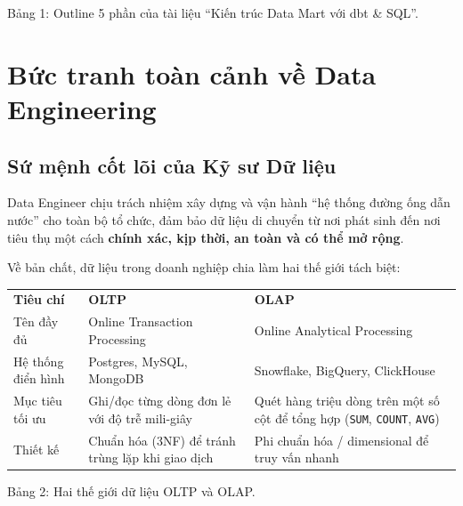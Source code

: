 \documentclass[12pt]{article}
\begin{document}
\begin{captionbelowboxaivn}
Bảng 1: Outline 5 phần của tài liệu ``Kiến trúc Data Mart với dbt \& SQL''.
\end{captionbelowboxaivn}

\section{Bức tranh toàn cảnh về Data Engineering}

\subsection{Sứ mệnh cốt lõi của Kỹ sư Dữ liệu}

Data Engineer chịu trách nhiệm xây dựng và vận hành ``hệ thống đường ống dẫn nước'' cho toàn bộ tổ chức, đảm bảo dữ liệu di chuyển từ nơi phát sinh đến nơi tiêu thụ một cách \textbf{chính xác, kịp thời, an toàn và có thể mở rộng}.

Về bản chất, dữ liệu trong doanh nghiệp chia làm hai thế giới tách biệt:

\noindent
\begin{longtable}{@{}>{\RaggedRight\arraybackslash}p{3.4cm}>{\RaggedRight\arraybackslash}p{4.4cm}>{\RaggedRight\arraybackslash}p{7.6cm}@{}}
\rowcolor{rowLavender}
\textbf{Tiêu chí} & \textbf{OLTP} & \textbf{OLAP} \\
\addlinespace[3pt]
\endhead
Tên đầy đủ & Online Transaction Processing & Online Analytical Processing \\
\addlinespace[3pt]
Hệ thống điển hình & Postgres, MySQL, MongoDB & Snowflake, BigQuery, ClickHouse \\
\addlinespace[3pt]
Mục tiêu tối ưu & Ghi/đọc từng dòng đơn lẻ với độ trễ mili-giây & Quét hàng triệu dòng trên một số cột để tổng hợp (\texttt{SUM}, \texttt{COUNT}, \texttt{AVG}) \\
\addlinespace[3pt]
Thiết kế & Chuẩn hóa (3NF) để tránh trùng lặp khi giao dịch & Phi chuẩn hóa / dimensional để truy vấn nhanh \\
\end{longtable}

\begin{captionbelowboxaivn}
Bảng 2: Hai thế giới dữ liệu OLTP và OLAP.
\end{captionbelowboxaivn}
\end{document}
